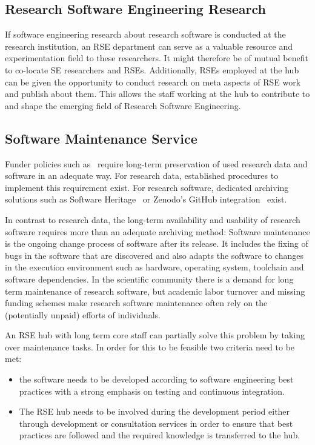 \documentclass[a4paper]{article}
\begin{document}
\subsection{Research Software Engineering Research}
\label{sec:rseresearch}

If software engineering research about research software is conducted at the research institution, an RSE department can serve as a valuable resource and experimentation field to these researchers.
It might therefore be of mutual benefit to co-locate SE researchers and RSEs.
Additionally, RSEs employed at the hub can be given the opportunity to conduct research on meta aspects of RSE work and publish about them.
This allows the staff working at the hub to contribute to and shape the emerging field of Research Software Engineering.

\subsection{Software Maintenance Service}
\label{sec:maintenance}

Funder policies such as~\autocite{dfg_gsp} require long-term preservation of used research data and software in an adequate way.
For research data, established procedures to implement this requirement exist.
For research software, dedicated archiving solutions such as Software Heritage~\autocite{DiCosmo2020,DiCosmo2023} or Zenodo's GitHub integration~\autocite{GitHubZenodo} exist.

In contrast to research data, the long-term availability and usability of research software requires more than an adequate archiving method:
Software maintenance is the ongoing change process of software after its release.
It includes the fixing of bugs in the software that are discovered and also adapts the software to changes in the execution environment such as hardware, operating system, toolchain and software dependencies.
In the scientific community there is a demand for long term maintenance of research software,
but academic labor turnover and missing funding schemes make research software maintenance often rely on the (potentially unpaid) efforts of individuals.

An RSE hub with long term core staff can partially solve this problem by taking over maintenance tasks.
In order for this to be feasible two criteria need to be met:
\begin{itemize}
\item the software needs to be developed according to software engineering best practices with a strong emphasis on testing and continuous integration.
\item The RSE hub needs to be involved during the development period either through development or consultation services in order to ensure that best practices are followed and the required knowledge is transferred to the hub.
\end{itemize}
\end{document}
